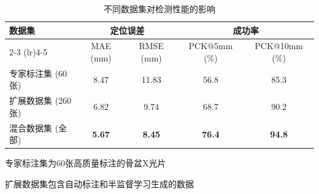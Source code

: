 \begin{table}[htbp]
    \centering
    \caption{不同数据集对检测性能的影响}
    \label{tab:dataset_comparison}
    \begin{threeparttable}
        \begin{tabular}{lcccc}
            \toprule
            \multirow{2}{*}{数据集} & \multicolumn{2}{c}{定位误差} & \multicolumn{2}{c}{成功率} \\
            \cmidrule(lr){2-3} \cmidrule(lr){4-5}
            & MAE (mm) & RMSE (mm) & PCK@5mm (\%) & PCK@10mm (\%) \\
            \midrule
            专家标注集 (60张)\tnote{*} & 8.47 & 11.83 & 56.8 & 85.3 \\
            扩展数据集 (260张)\tnote{\dag} & 6.82 & 9.74 & 68.7 & 90.2 \\
            混合数据集 (全部) & \textbf{5.67} & \textbf{8.45} & \textbf{76.4} & \textbf{94.8} \\
            \bottomrule
        \end{tabular}
        \begin{tablenotes}
            \footnotesize
            \item[*] 专家标注集为60张高质量标注的骨盆X光片
            \item[\dag] 扩展数据集包含自动标注和半监督学习生成的数据
        \end{tablenotes}
    \end{threeparttable}
\end{table} 